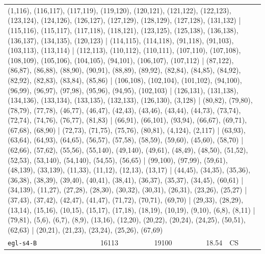 \begin{longtable}{lrrrl}
\multicolumn{5}{p{0.96\linewidth}}{\tiny\raggedright\arraybackslash (1,116), (116,117), (117,119), (119,120), (120,121), (121,122), (122,123), (123,124), (124,126), (126,127), (127,129), (128,129), (127,128), (131,132) | (115,116), (115,117), (117,118), (118,121), (123,125), (125,138), (136,138), (136,137), (134,135), (120,123) | (114,115), (114,118), (91,118), (91,103), (103,113), (113,114) | (112,113), (110,112), (110,111), (107,110), (107,108), (108,109), (105,106), (104,105), (94,101), (106,107), (107,112) | (87,122), (86,87), (86,88), (88,90), (90,91), (88,89), (89,92), (82,84), (84,85), (84,92), (82,92), (82,83), (83,84), (85,86) | (106,108), (102,104), (101,102), (94,100), (96,99), (96,97), (97,98), (95,96), (94,95), (102,103) | (126,131), (131,138), (134,136), (133,134), (133,135), (132,133), (126,130), (3,128) | (80,82), (79,80), (78,79), (77,78), (46,77), (46,47), (42,43), (43,46), (43,44), (44,73), (73,74), (72,74), (74,76), (76,77), (81,83) | (66,91), (66,101), (93,94), (66,67), (69,71), (67,68), (68,90) | (72,73), (71,75), (75,76), (80,81), (4,124), (2,117) | (63,93), (63,64), (64,93), (64,65), (56,57), (57,58), (58,59), (59,60), (45,60), (58,70) | (62,66), (57,62), (55,56), (55,140), (49,140), (49,61), (48,49), (48,50), (51,52), (52,53), (53,140), (54,140), (54,55), (56,65) | (99,100), (97,99), (59,61), (48,139), (33,139), (11,33), (11,12), (12,13), (13,17) | (44,45), (34,35), (35,36), (36,38), (38,39), (39,40), (40,41), (38,41), (36,37), (35,37), (34,45), (60,61) | (34,139), (11,27), (27,28), (28,30), (30,32), (30,31), (26,31), (23,26), (25,27) | (37,43), (37,42), (42,47), (41,47), (71,72), (70,71), (69,70) | (29,33), (28,29), (13,14), (15,16), (10,15), (15,17), (17,18), (18,19), (10,19), (9,10), (6,8), (8,11) | (79,81), (5,6), (6,7), (8,9), (13,16), (12,20), (20,22), (20,24), (24,25), (50,51), (62,63) | (20,21), (21,23), (23,24), (25,26), (67,69)} \\[2pt]
\texttt{egl-s4-B} & 16113 & 19100 & 18.54 & CS \\

\end{longtable}
